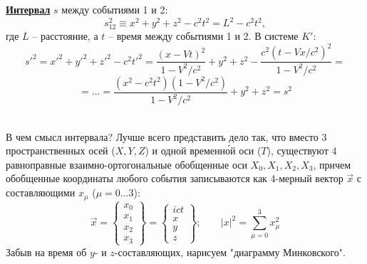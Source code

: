 \documentclass[12pt,epsfig,color,russian]{article}
\begin{document}
\underline{\bf Интервал} $s$ между событиями 1 и 2:
\begin{displaymath}
s_{12}^2\equiv x^2+y^2+z^2-c^2t^2 = L^2-c^2t^2,
\end{displaymath}
где $L$ -- расстояние, а $t$ -- время между событиями 1 и 2. В системе $K'$:
\begin{displaymath}
s'^2=x'^2+y'^2+z'^2-c^2t'^2 =
\frac{(x-Vt)^2}{1-V^2/c^2}+y^2+z^2-
\frac{c^2(t-Vx/c^2)^2}{1-V^2/c^2}=
\end{displaymath}
\begin{displaymath}
=\ldots=
\frac{(x^2-c^2t^2)(1-V^2/c^2)}{1-V^2/c^2}+y^2+z^2=s^2
\end{displaymath}
\centerline{}
\vspace{2mm}\\
В чем смысл интервала? Лучше всего представить дело так, что вместо 3 пространственных осей ($X,Y,Z$) и одной временн\'{о}й оси ($T$), существуют 4 равноправные взаимно-ортогональные обобщенные оси $X_0,X_1,X_2,X_3$, причем обобщен\-ные координаты любого события записываются как 4-мерный вектор $\vec{x}$ с составляющими $x_\mu$ ($\mu=0\ldots3$):
\begin{equation}\label{Eq.Int}
 \vec{x}=\left\{\begin{array}{c}
                 x_0\\ x_1\\ x_2\\ x_3
                \end{array}\right\}=
\left\{\begin{array}{c}
                 ict\\ x\\ y\\ z
                \end{array}\right\};\;\;\;\;\;\;\;|x|^2 = \sum_{\mu=0}^3x_\mu^2
\end{equation}
Забыв на время об $y$- и $z$-составляющих, нарисуем "диаграмму Минковского".
\\
\end{document}
